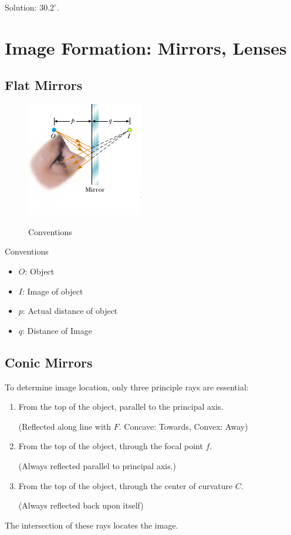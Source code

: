 \documentclass[a4paper,10pt]{report}
\begin{document}
  Solution: $30.2^{\circ}$.

\chapter{Image Formation: Mirrors, Lenses}

\section{Flat Mirrors}
  \begin{figure}[htpb]
  \begin{centering}
  \begin{center}
  \includegraphics[]{./pqmirror.png}
  \label{fig:parallel_diagram}
  \caption{Conventions}
  \end{center}
  \par\end{centering}
  \end{figure}
  Conventions
  \begin{itemize}
   \item $O$: Object
   \item $I$: Image of object
   \item $p$: Actual distance of object
   \item $q$: Distance of Image
  \end{itemize}

\section{Conic Mirrors}
To determine image location, only three principle rays are essential:
\begin{enumerate}
 \item
    From the top of the object, parallel to the principal axis.

    (Reflected along line with $F$. Concave: Towards, Convex: Away)
 \item
    From the top of the object, through the focal point $f$.

    (Always reflected parallel to principal axis.)
 \item
    From the top of the object, through the center of curvature $C$.

    (Always reflected back upon itself)
\end{enumerate}
The intersection of these rays locates the image.
\end{document}
